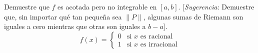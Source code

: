 \item Demuestre que $f$ es acotada pero no integrable en $[a, b]$. [\textit{Sugerencia}: Demuestre que, sin importar qué tan pequeña sea $\|P\|$, algunas sumas de Riemann son iguales a cero mientras que otras son iguales a $b - a$].
$$f(x) = \begin{cases} 
0 & \text{si } x \text{ es racional} \\ 
1 & \text{si } x \text{ es irracional} 
\end{cases}$$

